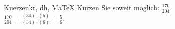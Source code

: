 \begin{MAufgabe}{Kuerzen}{kr, dh, MaTeX}
K\"urzen Sie soweit m\"oglich: $\frac{170}{204}$.\\ 
\ifLsg\MLoesung
\quad $\frac{170}{204}=\frac{(34)\cdot(5)}{(34)\cdot(6)}=\frac{5}{6}$.\else\relax\fi
 \end{MAufgabe}